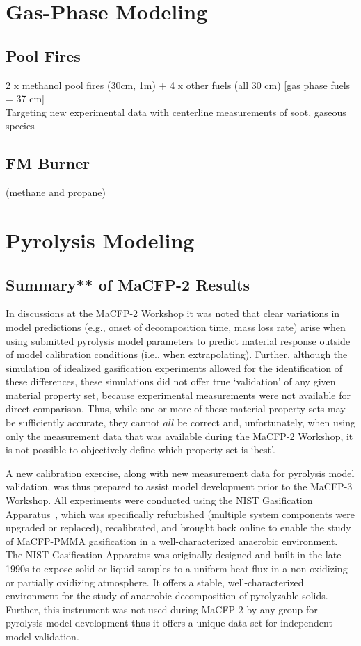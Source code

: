 \documentclass[12pt,demo]{article}
\begin{document}
\clearpage
\section{Gas-Phase Modeling}
\subsection{Pool Fires}
2 x methanol pool fires (30cm, 1m) + 4 x other fuels (all 30 cm) [gas phase fuels = 37 cm]\\
Targeting new experimental data with centerline measurements of soot, gaseous species

\subsection{FM Burner}
(methane and propane)


\clearpage
\section{Pyrolysis Modeling}
\label{Pyrolysis Modeling}
\subsection{Summary** of MaCFP-2 Results}
In discussions at the MaCFP-2 Workshop it was noted that clear variations in model predictions (e.g., onset of decomposition time, mass loss rate) arise when using submitted pyrolysis model parameters to predict material response outside of model calibration conditions (i.e., when extrapolating). Further, although the simulation of idealized gasification experiments allowed for the identification of these differences, these simulations did not offer true `validation' of any given material property set, because experimental measurements were not available for direct comparison. Thus, while one or more of these material property sets may be sufficiently accurate, they cannot $all$ be correct and, unfortunately, when using only the measurement data that was available during the MaCFP-2 Workshop, it is not possible to objectively define which property set is `best'.

A new calibration exercise, along with new measurement data for pyrolysis model validation, was thus prepared to assist model development prior to the MaCFP-3 Workshop. All experiments were conducted using the NIST Gasification Apparatus~\cite{austin1998gasification}, which was specifically refurbished (multiple system components were upgraded or replaced), recalibrated, and brought back online to enable the study of MaCFP-PMMA gasification in a well-characterized anaerobic environment. The NIST Gasification Apparatus was originally designed and built in the late 1990s to expose solid or liquid samples to a uniform heat flux in a non-oxidizing or partially oxidizing atmosphere. It offers a stable, well-characterized environment for the study of anaerobic decomposition of pyrolyzable solids. Further, this instrument was not used during MaCFP-2 by any group for pyrolysis model development thus it offers a unique data set for independent model validation.
\end{document}
